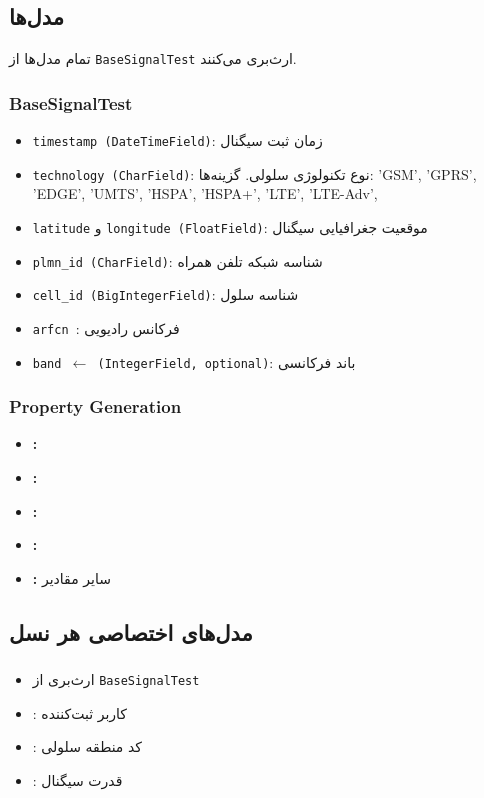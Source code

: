 \documentclass{report}
\begin{document}
\subsection{مدل‌ها}
تمام مدل‌ها از \texttt{BaseSignalTest} ارث‌بری می‌کنند.

\subsubsection{BaseSignalTest}
\begin{itemize}
    \item \texttt{timestamp (DateTimeField)}: زمان ثبت سیگنال
    \item \texttt{technology (CharField)}: نوع تکنولوژی سلولی. گزینه‌ها: 'GSM', 'GPRS', 'EDGE', 'UMTS', 'HSPA', 'HSPA+', 'LTE', 'LTE-Adv', 
    \item \texttt{latitude} و \texttt{longitude (FloatField)}: موقعیت جغرافیایی سیگنال
    \item \texttt{plmn\_id (CharField)}: شناسه شبکه تلفن همراه
    \item \texttt{cell\_id (BigIntegerField)}: شناسه سلول
    \item \texttt{arfcn }: فرکانس رادیویی
	\item \texttt{band $\leftarrow$ (IntegerField, optional)}: باند فرکانسی
\end{itemize}

\subsubsection{Property Generation}
\begin{itemize}
    \item \textbf{:} 
    \item \textbf{:} 
    \item \textbf{:} 
    \item \textbf{:} 
    \item \textbf{:} سایر مقادیر
\end{itemize}

\subsection{مدل‌های اختصاصی هر نسل}

\subsubsection{}
\begin{itemize}
    \item ارث‌بری از \texttt{BaseSignalTest}
    \item \texttt{}: کاربر ثبت‌کننده
    \item \texttt{}: کد منطقه سلولی
    \item \texttt{}: قدرت سیگنال
\end{itemize}
\end{document}
